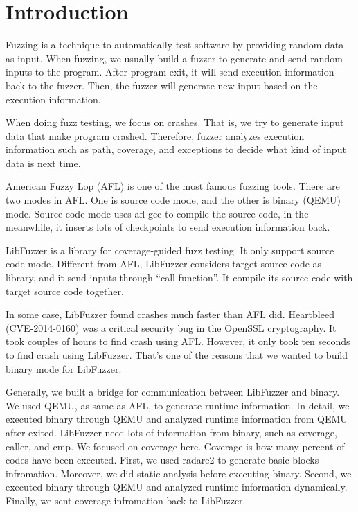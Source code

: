 
\section{Introduction}
\label{sec:intro}

  Fuzzing is a technique to automatically test software by providing random data as input. When fuzzing, we usually build a fuzzer to generate and send random inputs to the program. After program exit, it will send execution information back to the fuzzer. Then, the fuzzer will generate new input based on the execution information.

  When doing fuzz testing, we focus on crashes. That is, we try to generate input data that make program crashed. Therefore, fuzzer analyzes execution information such as path, coverage, and exceptions to decide what kind of input data is next time.

  American Fuzzy Lop (AFL)\cite{AFL} is one of the most famous fuzzing tools. There are two modes in AFL. One is source code mode, and the other is binary (QEMU) mode. Source code mode uses afl-gcc to compile the source code, in the meanwhile, it inserts lots of checkpoints to send execution information back.

  LibFuzzer\cite{libfuzz} is a library for coverage-guided fuzz testing. It only support source code mode. Different from AFL, LibFuzzer considers target source code as library, and it send inputs through “call function”. It compile its source code with target source code together.

  In some case, LibFuzzer found crashes much faster than AFL did. Heartbleed (CVE-2014-0160) was a critical security bug in the OpenSSL cryptography. It took couples of hours to find crash using AFL. However, it only took ten seconds to find crash using LibFuzzer. That’s one of the reasons that we wanted to build binary mode for LibFuzzer.

  Generally, we built a bridge for communication between LibFuzzer and binary. We used QEMU, as same as AFL, to generate runtime information. In detail, we executed binary through QEMU and analyzed runtime information from QEMU after exited. LibFuzzer need lots of information from binary, such as coverage, caller, and cmp. We focused on coverage here. Coverage is how many percent of codes have been executed. First, we used radare2 to generate basic blocks infromation. Moreover, we did static analysis before executing binary. Second, we executed binary through QEMU and analyzed runtime information dynamically. Finally, we sent coverage infromation back to LibFuzzer.
